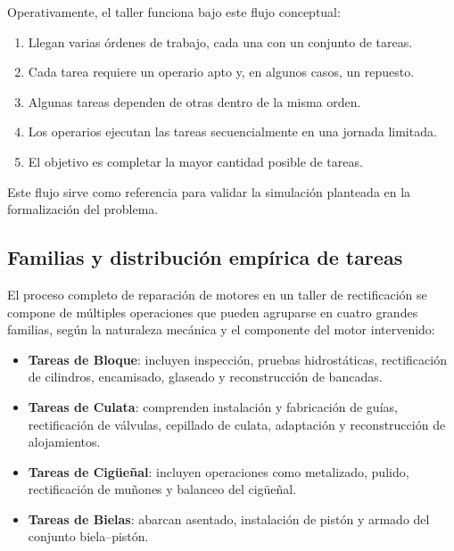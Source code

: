 Operativamente, el taller funciona bajo este flujo conceptual:
\begin{enumerate}
    \item Llegan varias órdenes de trabajo, cada una con un conjunto de tareas.
    \item Cada tarea requiere un operario apto y, en algunos casos, un repuesto.
    \item Algunas tareas dependen de otras dentro de la misma orden.
    \item Los operarios ejecutan las tareas secuencialmente en una jornada limitada.
    \item El objetivo es completar la mayor cantidad posible de tareas.
\end{enumerate}

Este flujo sirve como referencia para validar la simulación planteada en la formalización del problema.

\subsection{Familias y distribución empírica de tareas}

El proceso completo de reparación de motores en un taller de rectificación se compone de múltiples operaciones que pueden agruparse en cuatro grandes familias, según la naturaleza mecánica y el componente del motor intervenido:
\begin{itemize}
    \item \textbf{Tareas de Bloque}: incluyen inspección, pruebas hidrostáticas, rectificación de cilindros, encamisado, glaseado y reconstrucción de bancadas.
    \item \textbf{Tareas de Culata}: comprenden instalación y fabricación de guías, rectificación de válvulas, cepillado de culata, adaptación y reconstrucción de alojamientos.
    \item \textbf{Tareas de Cigüeñal}: incluyen operaciones como metalizado, pulido, rectificación de muñones y balanceo del cigüeñal.
    \item \textbf{Tareas de Bielas}: abarcan asentado, instalación de pistón y armado del conjunto biela--pistón.
\end{itemize}

